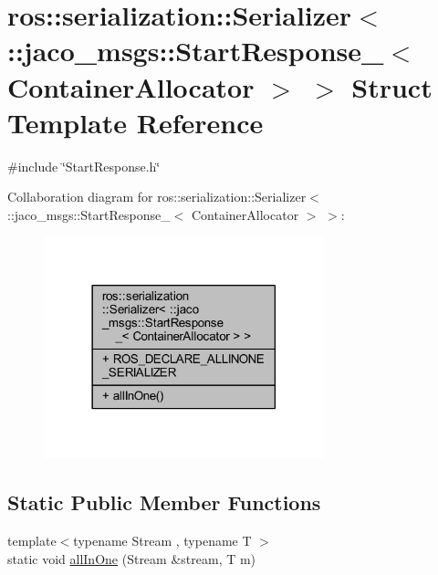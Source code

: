 \hypertarget{structros_1_1serialization_1_1Serializer_3_01_1_1jaco__msgs_1_1StartResponse___3_01ContainerAllocator_01_4_01_4}{}\section{ros\+:\+:serialization\+:\+:Serializer$<$ \+:\+:jaco\+\_\+msgs\+:\+:Start\+Response\+\_\+$<$ Container\+Allocator $>$ $>$ Struct Template Reference}
\label{structros_1_1serialization_1_1Serializer_3_01_1_1jaco__msgs_1_1StartResponse___3_01ContainerAllocator_01_4_01_4}


{\ttfamily \#include \char`\"{}Start\+Response.\+h\char`\"{}}



Collaboration diagram for ros\+:\+:serialization\+:\+:Serializer$<$ \+:\+:jaco\+\_\+msgs\+:\+:Start\+Response\+\_\+$<$ Container\+Allocator $>$ $>$\+:
\nopagebreak
\begin{figure}[H]
\begin{center}
\leavevmode
\includegraphics[width=230pt]{d0/ddc/structros_1_1serialization_1_1Serializer_3_01_1_1jaco__msgs_1_1StartResponse___3_01ContainerAllocator_01_4_01_4__coll__graph}
\end{center}
\end{figure}
\subsection*{Static Public Member Functions}
\begin{DoxyCompactItemize}
\item 
{\footnotesize template$<$typename Stream , typename T $>$ }\\static void \hyperlink{structros_1_1serialization_1_1Serializer_3_01_1_1jaco__msgs_1_1StartResponse___3_01ContainerAllocator_01_4_01_4_a37eee4f197c5764033b3e980cab5ddef}{all\+In\+One} (Stream \&stream, T m)
\end{DoxyCompactItemize}
